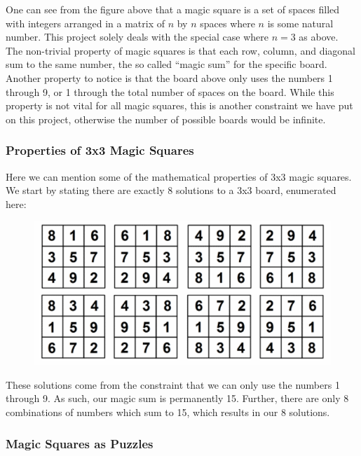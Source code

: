 \documentclass[a4paper]{article}
\begin{document}
One can see from the figure above that a magic square is a set of spaces filled with integers arranged in a matrix of $n$ by $n$ spaces where $n$ is some natural number. This project solely deals with the special case where $n = 3$ as above. \\

The non-trivial property of magic squares is that each row, column, and diagonal sum to the same number, the so called ``magic sum'' for the specific board. Another property to notice is that the board above only uses the numbers 1 through 9, or 1 through the total number of spaces on the board. While this property is not vital for all magic squares, this is another constraint we have put on this project, otherwise the number of possible boards would be infinite. 

\subsubsection{Properties of 3x3 Magic Squares}

Here we can mention some of the mathematical properties of 3x3 magic squares. We start by stating there are exactly 8 solutions to a 3x3 board, enumerated here:

\begin{figure} [h]
\includegraphics{solutions}
\centering
\end{figure}

These solutions come from the constraint that we can only use the numbers 1 through 9. As such, our magic sum is permanently 15. Further, there are only 8 combinations of numbers which sum to 15, which results in our 8 solutions. \\

\subsubsection{Magic Squares as Puzzles}
\end{document}
